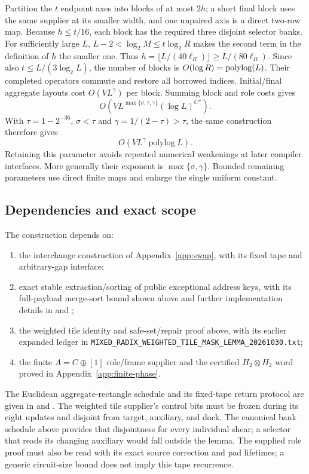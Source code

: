Partition the $t$ endpoint axes into blocks of at most $2h$; a short final
block uses the same supplier at its smaller width, and one unpaired axis
is a direct two-row map.  Because $h\le t/16$, each block has the required
three disjoint selector banks. For sufficiently large $L$,
$L-2<\log_2M\le t\log_2R$ makes the second term in the definition of $h$
the smaller one. Thus
$h=\lfloor L/(40\ell_R)\rfloor\ge L/(80\ell_R)$.
Since also $t\le L/(3\log_2L)$, the number of blocks is
$O(\log R)=\operatorname{polylog}(L)$.  Their completed operators commute and restore
all borrowed indices.  Initial/final aggregate layouts cost
$O(VL^\gamma)$ per block.  Summing block and role costs gives
\[
 O\!\left(VL^{\max\{\sigma,\tau,\gamma\}}(\log L)^{C''}\right).
\]
With $\tau=1-2^{-36}$, $\sigma<\tau$ and
$\gamma=1/(2-\tau)>\tau$, the same construction therefore gives
\[
                         O(VL^\gamma\operatorname{polylog}L).
\]
Retaining this parameter avoids repeated numerical weakenings at later
compiler interfaces. More generally their exponent is
$\max\{\sigma,\gamma\}$. Bounded remaining parameters use direct
finite maps and enlarge the single uniform constant.

\subsection{Dependencies and exact scope}

The construction depends on:
\begin{enumerate}
 \item the interchange construction of Appendix~\ref{app:swap}, with its fixed
   tape and arbitrary-gap interface;
 \item exact stable extraction/sorting of public exceptional address
   keys, with its full-payload merge-sort bound shown above and further
   implementation details in
     and
    ;
 \item the weighted tile identity and safe-set/repair proof above,
   with its earlier expanded ledger in
   \texttt{MIXED\_RADIX\_WEIGHTED\_TILE\_MASK\_LEMMA\_20261030.txt};
 \item the finite $A=C\oplus[1]$ role/frame supplier and the certified
   $H_2\otimes H_2$ word proved in Appendix~\ref{app:finite-phase}.
\end{enumerate}
The Euclidean aggregate-rectangle schedule and its fixed-tape return
protocol are given in
 and
.
The weighted tile supplier's control bits must be frozen during its
eight updates and disjoint from target, auxiliary, and dock.  The
canonical bank schedule above provides that disjointness for every
individual shear; a selector that reads its changing auxiliary would
fall outside the lemma.  The supplied role proof must also be read with
its exact source correction and pad lifetimes; a generic circuit-size
bound does not imply this tape recurrence.

